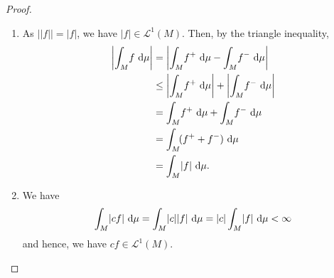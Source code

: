 \begin{proof}
\begin{enumerate}[label=(\roman*)]
\item As $\bigl| |f| \bigr|=|f|$, we have $|f| \in \mathscr{L}^1(M)$. Then, by the triangle inequality,
\begin{align*}
\left|  \int_M \! f \, \d \mu \right|
&= \left|  \int_M \! f^+ \, \d \mu -   \int_M \! f^- \, \d \mu \right|\\
& \leq \left|  \int_M \! f^+ \, \d \mu  \right| + \left| \int_M \! f^- \, \d \mu \right|\\
&=  \int_M \! f^+ \, \d \mu + \int_M \! f^- \, \d \mu \\
&=  \int_M \! (f^+ + f^-)\, \d \mu  \\
&= \int_M \!  |f| \, \d \mu.
\end{align*}
\item We have
\begin{equation*}
\int_M \!  |c f| \, \mathop{}\!\mathrm{d} \mu = \int_M \!  |c||f| \, \mathop{}\!\mathrm{d} \mu = |c|\int_M \!  | f| \, \mathop{}\!\mathrm{d} \mu< \infty
\end{equation*}
and hence, we have $c f \in \mathscr{L}^1(M)$.


\end{enumerate}
\end{proof}
